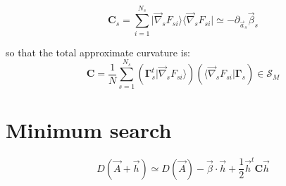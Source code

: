 \documentclass[aps,12pt]{revtex4}
\begin{document}
\begin{equation}
	\bm{C}_s = \sum_{i=1}^{N_s} \vert \vec{\nabla}_s F_{si} \rangle  \langle \vec{\nabla}_s F_{si} \vert \simeq -\partial_{\vec{a}_s} \vec{\beta}_s 
\end{equation}

so that the total approximate curvature is:
\begin{equation}
	\bm{C} =  \dfrac{1}{N} \sum_{s=1}^{N_s} \left(  \bm{\Gamma}_s^t \vert \vec{\nabla}_s F_{si} \rangle\right) \left( \langle \vec{\nabla}_s F_{si} \vert \bm{\Gamma}_s\right) \in \mathcal{S}_M
\end{equation}


\section{Minimum search}

\begin{equation}
	D(\vec{A} + \vec{h}) \simeq D(\vec{A}) - \vec{\beta} \cdot \vec{h} + \dfrac{1}{2} \vec{h}^t \bm{C} \vec{h}
\end{equation}
\end{document}
